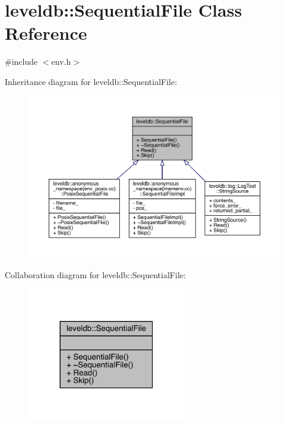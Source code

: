 \hypertarget{classleveldb_1_1_sequential_file}{}\section{leveldb\+:\+:Sequential\+File Class Reference}
\label{classleveldb_1_1_sequential_file}


{\ttfamily \#include $<$env.\+h$>$}



Inheritance diagram for leveldb\+:\+:Sequential\+File\+:
\nopagebreak
\begin{figure}[H]
\begin{center}
\leavevmode
\includegraphics[width=350pt]{classleveldb_1_1_sequential_file__inherit__graph}
\end{center}
\end{figure}


Collaboration diagram for leveldb\+:\+:Sequential\+File\+:\nopagebreak
\begin{figure}[H]
\begin{center}
\leavevmode
\includegraphics[width=197pt]{classleveldb_1_1_sequential_file__coll__graph}
\end{center}
\end{figure}
